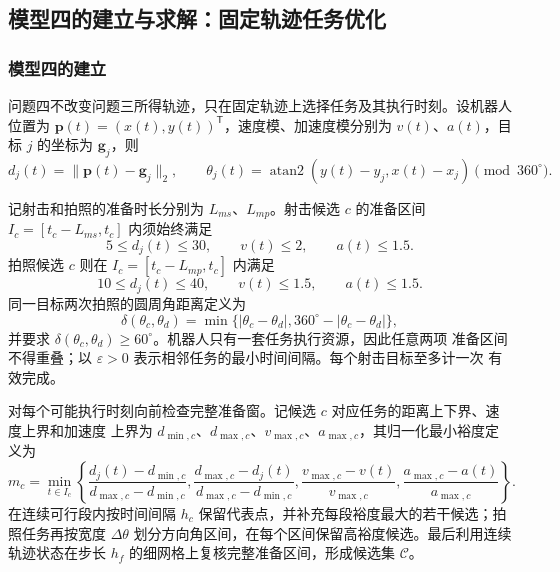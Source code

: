 \subsection{模型四的建立与求解：固定轨迹任务优化}\label{sec:model-q4}

\subsubsection{模型四的建立}\label{sec:q4-establishment}

问题四不改变问题三所得轨迹，只在固定轨迹上选择任务及其执行时刻。设机器人位置为
$\mathbf p(t)=(x(t),y(t))^{\mathsf T}$，速度模、加速度模分别为 $v(t)$、$a(t)$，目标
$j$ 的坐标为 $\mathbf g_j$，则
\begin{equation}
d_j(t)=\|\mathbf p(t)-\mathbf g_j\|_2,
\qquad
\theta_j(t)=\operatorname{atan2}(y(t)-y_j,x(t)-x_j)\pmod {360^\circ}.
\label{eq:q4-geometry}
\end{equation}

记射击和拍照的准备时长分别为 $L_{
m s}$、$L_{
m p}$。射击候选 $c$ 的准备区间
$I_c=[t_c-L_{
m s},t_c]$ 内须始终满足
\begin{equation}
5\le d_j(t)\le30,\qquad v(t)\le2,\qquad a(t)\le1.5.
\label{eq:q4-shooting-constraints}
\end{equation}
拍照候选 $c$ 则在 $I_c=[t_c-L_{
m p},t_c]$ 内满足
\begin{equation}
10\le d_j(t)\le40,\qquad v(t)\le1.5,\qquad a(t)\le1.5.
\label{eq:q4-photo-constraints}
\end{equation}
同一目标两次拍照的圆周角距离定义为
\begin{equation}
\delta(\theta_c,\theta_d)=\min\{|\theta_c-\theta_d|,
360^\circ-|\theta_c-\theta_d|\},
\label{eq:q4-circular-angle}
\end{equation}
并要求 $\delta(\theta_c,\theta_d)\ge60^\circ$。机器人只有一套任务执行资源，因此任意两项
准备区间不得重叠；以 $\varepsilon>0$ 表示相邻任务的最小时间间隔。每个射击目标至多计一次
有效完成。

对每个可能执行时刻向前检查完整准备窗。记候选 $c$ 对应任务的距离上下界、速度上界和加速度
上界为 $d_{\min,c}$、$d_{\max,c}$、$v_{\max,c}$、$a_{\max,c}$，其归一化最小裕度定义为
\begin{equation}
m_c=\min_{t\in I_c}\left\{
\frac{d_j(t)-d_{\min,c}}{d_{\max,c}-d_{\min,c}},
\frac{d_{\max,c}-d_j(t)}{d_{\max,c}-d_{\min,c}},
\frac{v_{\max,c}-v(t)}{v_{\max,c}},
\frac{a_{\max,c}-a(t)}{a_{\max,c}}
\right\}.
\label{eq:q4-margin}
\end{equation}
在连续可行段内按时间间隔 $h_c$ 保留代表点，并补充每段裕度最大的若干候选；拍照任务再按宽度
$\Delta\theta$ 划分方向角区间，在每个区间保留高裕度候选。最后利用连续轨迹状态在步长 $h_f$
的细网格上复核完整准备区间，形成候选集 $\mathcal C$。

